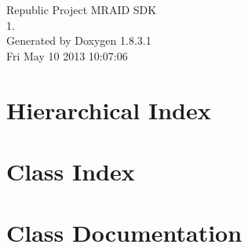 \documentclass{book}
\begin{document}
\hypersetup{pageanchor=false,citecolor=blue}
\begin{titlepage}
\vspace*{7cm}
\begin{center}
{\Large Republic Project M\-R\-A\-I\-D S\-D\-K \\[1ex]\large 1. }\\
\vspace*{1cm}
{\large Generated by Doxygen 1.8.3.1}\\
\vspace*{0.5cm}
{\small Fri May 10 2013 10:07:06}\\
\end{center}
\end{titlepage}
\clearemptydoublepage
{}
\tableofcontents
\clearemptydoublepage
{}
\hypersetup{pageanchor=true,citecolor=blue}
\chapter{Hierarchical Index}

\chapter{Class Index}

\chapter{Class Documentation}
























\printindex
\end{document}
